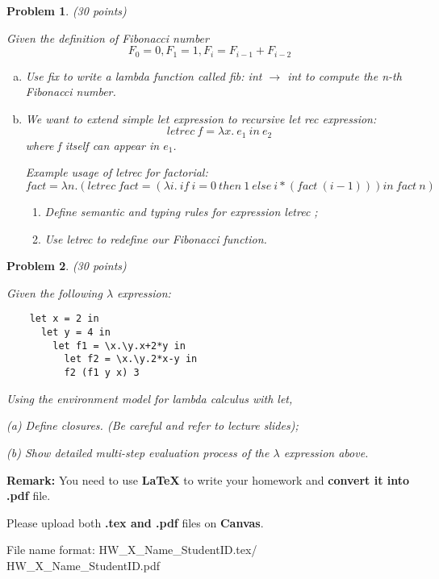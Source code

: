 \documentclass[12pt]{article}
\newtheorem{hw}{Problem}
\begin{document}
\begin{hw}\rm (30 points)

	Given the definition of Fibonacci number
	\[F_0 = 0, F_1 = 1, F_i = F_{i-1} + F_{i-2}\]
	\begin{enumerate}[(a)]
	\item Use \textit{fix} to write a lambda function called \textit{fib}: int $\rightarrow$ int to compute the n-th Fibonacci number.
	\item We want to extend simple \textit{let} expression to recursive \textit{let rec} expression:
	\[letrec\ f = \lambda x.\ e_{1}\ in\ e_{2}\]
	where f itself can appear in $e_{1}$. 
	
	Example usage of \textit{letrec} for factorial:
	\[fact = \lambda n. (letrec\ fact= (\lambda i.\ if\ i=0\ then\ 1\ else\ i*(fact\ (i-1))) in\ fact\ n)\]
	
	\begin{enumerate}[(1)]
	\item Define semantic and typing rules for expression \textit{letrec} ;
	\item Use \textit{letrec} to redefine our Fibonacci function.
	
	\end{enumerate}
	
	\end{enumerate}
\end{hw}

\begin{hw}\rm (30 points)

	Given the following $\lambda$ expression:
	\begin{verbatim}
	let x = 2 in
	  let y = 4 in
	    let f1 = \x.\y.x+2*y in
	      let f2 = \x.\y.2*x-y in
	      f2 (f1 y x) 3
	\end{verbatim}
	
	Using the environment model for lambda calculus with let,
		
	(a) Define closures. (Be careful and refer to lecture slides);
	 
	(b) Show detailed multi-step evaluation process of the $\lambda$ expression above.
	
\end{hw}

\vspace{20pt}

\textbf{Remark:} 
You need to use \textbf{LaTeX} to write your homework and \textbf{convert it into .pdf} file.

Please upload both \textbf{.tex and .pdf} files on \textbf{Canvas}.

File name format: {\color{red} HW\_X\_Name\_StudentID.tex/\color{red} HW\_X\_Name\_StudentID.pdf}
\end{document}
